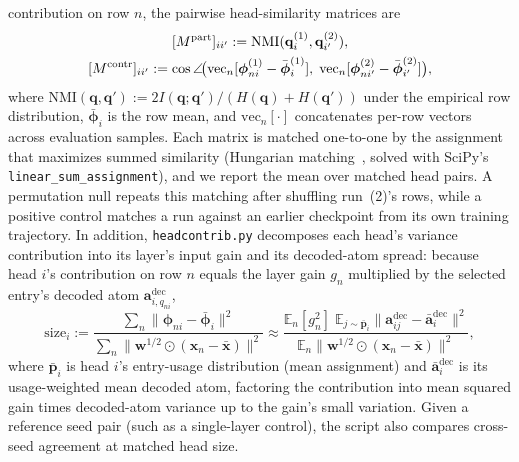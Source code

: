 contribution on row $n$, the pairwise head-similarity matrices are
\begin{equation}
	\begin{gathered}
	\relax [M^{\mathrm{part}}]_{ii'} := \mathrm{NMI}(\mathbf{q}^{(1)}_{i}, \mathbf{q}^{(2)}_{i'}),
	\\
	[M^{\mathrm{contr}}]_{ii'} := \cos\angle\!\big(\mathrm{vec}_{n}[\boldsymbol{\phi}^{(1)}_{ni}
	- \bar{\boldsymbol{\phi}}^{(1)}_{i}],\; \mathrm{vec}_{n}[\boldsymbol{\phi}^{(2)}_{ni'}
	- \bar{\boldsymbol{\phi}}^{(2)}_{i'}]\big),
	\end{gathered}
	\label{eq:headmatch}
\end{equation}
where $\mathrm{NMI}(\mathbf{q}, \mathbf{q}') := 2I(\mathbf{q};\mathbf{q}')/
(H(\mathbf{q})+H(\mathbf{q}'))$ under the empirical row distribution,
$\bar{\boldsymbol{\phi}}_i$ is the row mean, and $\mathrm{vec}_n[\cdot]$
concatenates per-row vectors across evaluation samples. Each matrix is
matched one-to-one by the assignment that maximizes summed similarity
(Hungarian matching~\cite{kuhn1955}, solved with SciPy's
\texttt{linear\_sum\_assignment}), and we report the mean over matched
head pairs. A permutation
null repeats this matching after shuffling run~(2)'s rows, while a positive
control matches a run against an earlier checkpoint from its own training
trajectory. In addition, \texttt{headcontrib.py} decomposes each head's
variance contribution into its layer's input gain and its decoded-atom
spread: because head $i$'s contribution on row $n$ equals the layer gain
$g_n$ multiplied by the selected entry's decoded atom
$\mathbf{a}^{\mathrm{dec}}_{i,q_{ni}}$,
\begin{equation}
	\mathrm{size}_i := \frac{\sum_n \lVert \boldsymbol{\phi}_{ni} - \bar{\boldsymbol{\phi}}_i\rVert^2}
	                       {\sum_n \lVert \mathbf{w}^{1/2} \odot (\mathbf{x}_n - \bar{\mathbf{x}})\rVert^2}
	\approx \frac{\mathbb{E}_n[g_n^2]\; \mathbb{E}_{j \sim \bar{\mathbf{p}}_i}
	        \lVert \mathbf{a}^{\mathrm{dec}}_{ij} - \bar{\mathbf{a}}^{\mathrm{dec}}_i\rVert^2}
	       {\mathbb{E}_n \lVert \mathbf{w}^{1/2} \odot (\mathbf{x}_n - \bar{\mathbf{x}})\rVert^2},
	\label{eq:headsize}
\end{equation}
where $\bar{\mathbf{p}}_i$ is head $i$'s entry-usage distribution (mean
assignment) and $\bar{\mathbf{a}}^{\mathrm{dec}}_i$ is its usage-weighted
mean decoded atom, factoring the contribution into mean squared gain times
decoded-atom variance up to the gain's small variation. Given a
reference seed pair (such as a single-layer control), the script also
compares cross-seed agreement at matched head size.

